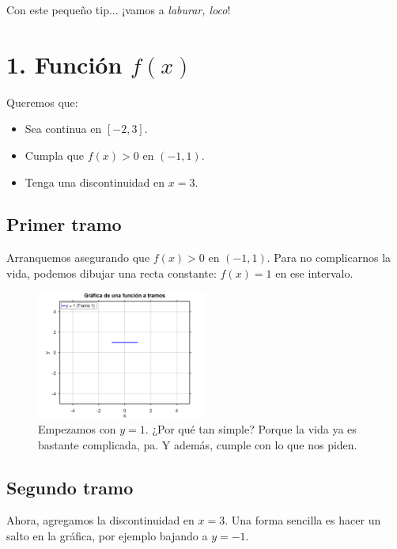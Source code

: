 \documentclass[12pt]{article}
\let\oldincludegraphics\includegraphics
\renewcommand{\includegraphics}[2][]{%
  \oldincludegraphics[width=0.5\textwidth,#1]{#2}%
}
\begin{document}
Con este pequeño tip... ¡vamos a \textit{laburar, loco}! 

\section*{1. Función $f(x)$}
Queremos que:
\begin{itemize}
  \item Sea continua en $[-2,3]$.
  \item Cumpla que $f(x) > 0$ en $(-1,1)$.
  \item Tenga una discontinuidad en $x=3$.
\end{itemize}

\subsection*{Primer tramo}
Arranquemos asegurando que $f(x) > 0$ en $(-1,1)$.  
Para no complicarnos la vida, podemos dibujar una recta constante: $f(x) = 1$ en ese intervalo.

\begin{figure}[H]
  \centering
  \includegraphics{img/primertramo.png}
  \caption{Empezamos con $y=1$. ¿Por qué tan simple? Porque la vida ya es bastante complicada, pa. Y además, cumple con lo que nos piden.}
\end{figure}

\subsection*{Segundo tramo}
Ahora, agregamos la discontinuidad en $x=3$.  
Una forma sencilla es hacer un salto en la gráfica, por ejemplo bajando a $y=-1$.
\end{document}
